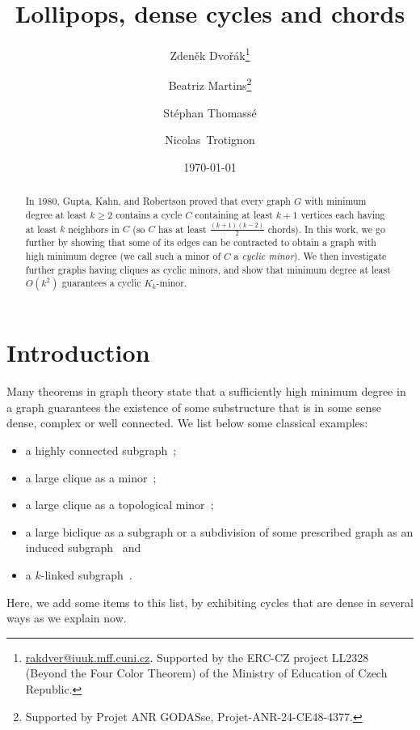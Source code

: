 \documentclass[11pt]{article}
\author[1]{Zdeněk Dvořák\thanks{\url{rakdver@iuuk.mff.cuni.cz}. Supported by the ERC-CZ project LL2328 (Beyond the Four Color Theorem) of the Ministry of Education of Czech Republic.}}
\author[2]{Beatriz Martins\thanks{Supported by Projet ANR GODASse, Projet-ANR-24-CE48-4377.}}
\author[2]{Stéphan Thomassé\samethanks}
\author[2]{Nicolas~Trotignon\samethanks}
\affil[1]{Computer Science Institute, Charles University, Prague,\newline Czech Republic.}
\affil[2]{ENS de Lyon, CNRS, Université Claude Bernard Lyon 1,\newline LIP UMR 5668, 69342 Lyon Cedex 07, France.}
\begin{document}
\title{Lollipops, dense cycles and chords}



\date{\today}

\maketitle


\begin{abstract}
In 1980, Gupta, Kahn, and Robertson proved that every graph $G$ with minimum degree at least $k\geq 2$ contains a cycle $C$ containing  at least $k+1$ vertices each having at least $k$ neighbors in $C$ (so $C$ has at least $\frac{(k+1)(k-2)}{2}$ chords). In this work, we go further by showing that some of its edges can be contracted to obtain a graph with high minimum degree (we call such a minor of $C$ a \emph{cyclic minor}). We then investigate further graphs having cliques as cyclic minors, and show that minimum degree at least $O(k^2)$ guarantees a cyclic $K_k$-minor. 
\end{abstract}



\section{Introduction}
    Many theorems in graph theory state that a sufficiently high minimum degree in a graph guarantees the existence of some substructure that is in some sense dense, complex or well connected. We list below some classical examples:
    
    \begin{itemize}
        \item a highly connected subgraph~\cite{MADER72};
        \item a large clique as a minor~\cite{kos1982,DBLP:journals/dm/Vega83};
        \item a large clique as a topological minor~\cite{BBAT98};
        \item a large biclique as a subgraph or a subdivision of some prescribed graph as an induced subgraph~\cite{kuhn2004induced} and
        \item a $k$-linked subgraph~\cite{THOMAS2005309}.
    \end{itemize}


    Here, we add some items to this list, by exhibiting cycles that are dense in several ways as we explain now. 
    
\end{document}
